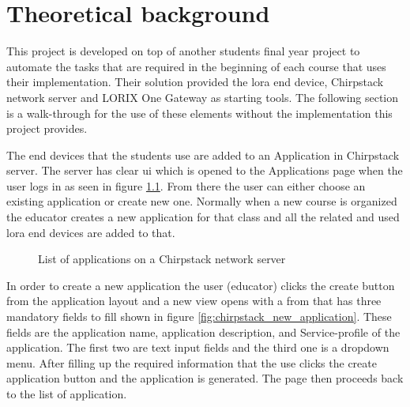
\chapter{Theoretical background} \label{ch:theor_backgr}

This project is developed on top of another students final year project \cite{theseus:gere-zoltan} to automate the tasks that are required in the beginning of each course that uses their implementation.
Their solution provided the \gls{lora} end device, Chirpstack network server and LORIX One Gateway as starting tools.
The following section is a walk-through for the use of these elements without the implementation this project provides.

The end devices that the students use are added to an Application in Chirpstack server.
The server has clear \gls{ui} which is opened to the Applications page when the user logs in as seen in figure \ref{fig:chirpstack_application_list}.
From there the user can either choose an existing application or create new one.
Normally when a new course is organized the educator creates a new application for that class and all the related and used \gls{lora} end devices are added to that.

\begin{figure}[ht]
  \centering
  \caption{List of applications on a Chirpstack network server}
  \label{fig:chirpstack_application_list}
\end{figure}

In order to create a new application the user (educator) clicks the create button from the application layout and a new view opens with a from that has three mandatory fields to fill shown in figure \ref{fig:chirpstack_new_application}.
These fields are the application name, application description, and Service-profile of the application.
The first two are text input fields and the third one is a dropdown menu.
After filling up the required information that the use clicks the create application button and the application is generated.
The page then proceeds back to the list of application.


